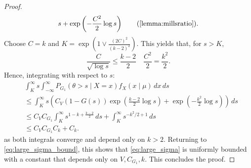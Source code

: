 \documentclass[10pt,a4paper]{amsart}
\newcommand{\parens}[1]{\left({#1}\right)}
\newcommand{\pr}{\parens}
\begin{document}
\begin{proof}
\begin{align*}
{s} + \exp\pr{-\frac{C^2}{2} \log s} \tag{\cref{lemma:millsratio}}.
\end{align*}
Choose $C = k$ and $ K = \exp\pr{1 \vee \frac{(2C)^2}{(k-2)^2}}$. This yields that, for
$s > K$, \[
\frac{C}{\sqrt{\log s}}  \le \frac{k-2}{2} \quad \frac{C^2}{2} = \frac{k^2}{2}.
\]
Hence, integrating with respect to $s$: \begin{align*}
&\int_K^\infty s \int_{-\infty}^\infty P_{G_1}(\theta > s \mid X=x) f_X
(x\mid \mu)\,dx\,ds \\
&\le \int_K^\infty s 
\pr{C_V (1-G(s)) \exp\pr{ \frac{k-2}{2} \log
s} + \exp\pr{-\frac{k^2}{2} \log s}} \,ds \\
&\le C_{V} C_{G_1} \int_K^\infty s^{1-k+\frac{k-2}{2}}\,ds + \int_{K}^\infty s^{-k^2/2 +1}
\,ds \\
&\le C_V C_{G_1} C_k + C_k. \tag{$1-k+(k-2)/2 < -1$ and $-k^2/2+1 < -1$}
\end{align*}
as both integrals converge and depend only on $k > 2$. Returning to 
\eqref{eq:large_sigma_bound}, this shows that \eqref{eq:large_sigma} is uniformly bounded
with a constant that depends only on $V, C_{G_1}, k$. This concludes the proof.
\end{proof}
\end{document}
